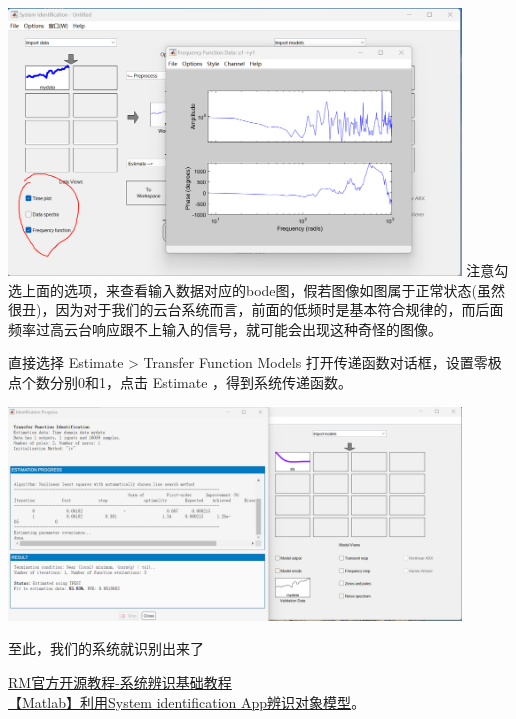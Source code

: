 \documentclass[UTF8,a4paper,12pt]{ctexart}
\begin{document}
\begin{flushleft}
\begin{flushleft}
        \par \includegraphics[width=12cm]{picture/bode.png}
        注意勾选上面的选项，来查看输入数据对应的bode图，假若图像如图属于正常状态(虽然很丑)，因为对于我们的云台系统而言，前面的低频时是基本符合规律的，而后面频率过高云台响应跟不上输入的信号，就可能会出现这种奇怪的图像。
      \end{flushleft}
      \begin{flushleft}
        直接选择 Estimate > Transfer Function Models 打开传递函数对话框，设置零极点个数分别0和1，点击 Estimate ，得到系统传递函数。
        \par \includegraphics[width=12cm]{picture/identify_result.png}
      \end{flushleft}
      至此，我们的系统就识别出来了
    \end{flushleft}
    

    \href{https://bbs.robomaster.com/wiki/4574/3559}{RM官方开源教程-系统辨识基础教程}
    \\\href{ https://blog.csdn.net/xiaohejiaoyiya/article/details/105958551?ops_request_misc=%257B%2522request%255Fid%2522%253A%2522d515a96088d8f99093ec8d0b4cb80d62%2522%252C%2522scm%2522%253A%252220140713.130102334.pc%255Fall.%2522%257D&request_id=d515a96088d8f99093ec8d0b4cb80d62&biz_id=0&utm_medium=distribute.pc_search_result.none-task-blog-2~all~first_rank_ecpm_v1~rank_v31_ecpm-1-105958551-null-null.142^v100^pc_search_result_base1&utm_term=%E5%88%A9%E7%94%A8system%20identification%E7%A1%AE%E8%AE%A4%E6%A8%A1%E5%9E%8B&spm=1018.2226.3001.4187}{【Matlab】利用System identification App辨识对象模型}。
\end{document}
